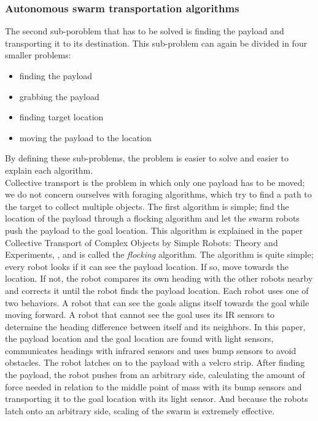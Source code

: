\subsubsection{Autonomous swarm transportation algorithms}
The second sub-poroblem that has to be solved is finding the payload and transporting it to its destination.
This sub-problem can again be divided in four smaller problems:

\begin{itemize}
	\item finding the payload
	\item grabbing the payload
	\item finding target location
	\item moving the payload to the location
\end{itemize}

By defining these sub-problems, the problem is easier to solve and easier to explain each algorithm. \\

Collective transport is the problem in which only one payload has to be moved; we do not concern ourselves with foraging algorithms, which try to find a path to the target to collect multiple objects.
The first algorithm is simple; find the location of the payload through a flocking algorithm and let the swarm robots push the payload to the goal location. 
This algorithm is explained in the paper Collective Transport of Complex Objects by Simple Robots: Theory and Experiments, \cite{Rubenstein2013}, and is called the \emph{flocking} algorithm.
The algorithm is quite simple; every robot looks if it can see the payload location. If so, move towards the location. If not, the robot compares its own heading with the other robots nearby and corrects it until the robot finds the payload location.
Each robot uses one of two behaviors.
 A robot that can see the goals aligns itself towards the goal while moving forward.
 A robot that cannot see the goal uses its IR sensors to determine the heading difference between itself and its neighbors.
 In this paper, the payload location and the goal location are found with light sensors, communicates headings with infrared sensors and uses bump sensors to avoid obstacles. 
The robot latches on to the payload with a velcro strip.
After finding the payload, the robot pushes from an arbitrary side, calculating the amount of force needed in relation to the middle point of mass with its bump sensors and transporting it to the goal location with its light sensor.  
And because the robots latch onto an arbitrary side, scaling of the swarm is extremely effective. \\ 


